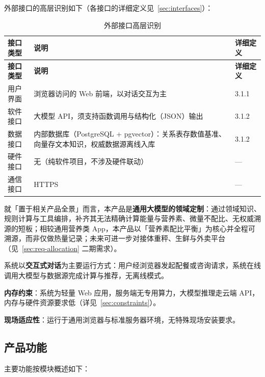\documentclass[12pt,a4paper]{ctexart}
\begin{document}
外部接口的高层识别如下（各接口的详细定义见~\ref{sec:interfaces}）：

\begin{xltabular}{\linewidth}{p{2.2cm}LP{2.0cm}}
\caption{外部接口高层识别} \\
\toprule
\textbf{接口类型} & \textbf{说明} & \textbf{详细定义} \\
\midrule
\endfirsthead
\toprule
\textbf{接口类型} & \textbf{说明} & \textbf{详细定义} \\
\midrule
\endhead
用户界面 & 浏览器访问的 Web 前端，以对话交互为主 & 3.1.1 \\
软件接口 & 大模型 API，须支持函数调用与结构化（JSON）输出 & 3.1.2 \\
数据接口 & 内部数据库（PostgreSQL + pgvector）：关系表存数值基准、向量存文本知识，权威数据源离线入库 & 3.1.2 \\
硬件接口 & 无（纯软件项目，不涉及硬件联动） & --- \\
通信接口 & HTTPS & --- \\
\bottomrule
\end{xltabular}

就「置于相关产品全景」而言，本产品是\textbf{通用大模型的领域定制}：通过领域知识、规则计算与工具编排，补齐其无法精确计算能量与营养素、微量不配比、无权威溯源的短板；相较通用营养类 App，本产品以「营养素配比平衡」为核心并全程可溯源，而非仅做热量记录；未来可进一步对接体重秤、生鲜与外卖平台（见~\ref{sec:req-allocation} 二期需求）。

系统以\textbf{交互式对话}为主要运行方式：用户经浏览器发起配餐或咨询请求，系统在线调用大模型与数据源完成计算与推荐，无离线模式。

\textbf{内存约束}：系统为轻量 Web 应用，服务端无专用算力，大模型推理走云端 API，内存与硬件资源要求低（详见~\ref{sec:constraints}）。

\textbf{现场适应性}：运行于通用浏览器与标准服务器环境，无特殊现场安装要求。

\subsection{产品功能}\label{sec:product-function}

主要功能按模块概述如下：
\end{document}
